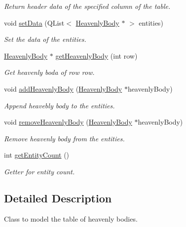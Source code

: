 \begin{DoxyCompactItemize}
\begin{DoxyCompactList}\small\item\em \-Return header data of the specified column of the table. \end{DoxyCompactList}\item 
void \hyperlink{classHeavenlyBodyTableModel_a778e03d39ffc8de5535338cc0c376490}{set\-Data} (\-Q\-List$<$ \hyperlink{classHeavenlyBody}{\-Heavenly\-Body} $\ast$ $>$ entities)
\begin{DoxyCompactList}\small\item\em \-Set the data of the entities. \end{DoxyCompactList}\item 
\hyperlink{classHeavenlyBody}{\-Heavenly\-Body} $\ast$ \hyperlink{classHeavenlyBodyTableModel_aa1f5ef18f01caefb1fd8ba203eb120b6}{get\-Heavenly\-Body} (int row)
\begin{DoxyCompactList}\small\item\em \-Get heavenly boda of row row. \end{DoxyCompactList}\item 
void \hyperlink{classHeavenlyBodyTableModel_ac330b96c60f4ae48779d22b7ab20a0a2}{add\-Heavenly\-Body} (\hyperlink{classHeavenlyBody}{\-Heavenly\-Body} $\ast$heavenly\-Body)
\begin{DoxyCompactList}\small\item\em \-Append heavebly body to the entities. \end{DoxyCompactList}\item 
void \hyperlink{classHeavenlyBodyTableModel_a33c83125e548ef7517a9badd4088ff55}{remove\-Heavenly\-Body} (\hyperlink{classHeavenlyBody}{\-Heavenly\-Body} $\ast$heavenly\-Body)
\begin{DoxyCompactList}\small\item\em \-Remove heavenly body from the entities. \end{DoxyCompactList}\item 
int \hyperlink{classHeavenlyBodyTableModel_ae5686498c41df95b2764c2fdaff3e2a8}{get\-Entity\-Count} ()
\begin{DoxyCompactList}\small\item\em \-Getter for entity count. \end{DoxyCompactList}\end{DoxyCompactItemize}


\subsection{\-Detailed \-Description}
\-Class to model the table of heavenly bodies.

